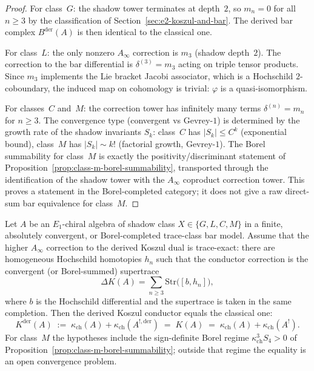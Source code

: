 \begin{proof}
For class~$G$: the shadow tower terminates at depth~$2$, so $m_n = 0$
for all $n \geq 3$ by the classification of
Section~\ref{sec:e2-koszul-and-bar}. The derived bar complex
$B^{\mathrm{der}}(A)$ is then identical to the classical one.

For class~$L$: the only nonzero $A_\infty$ correction is $m_3$
(shadow depth~$2$). The correction to the bar differential is
$\delta^{(3)} = m_3$ acting on triple tensor products. Since $m_3$
implements the Lie bracket Jacobi associator, which is a Hochschild
$2$-coboundary, the induced map on cohomology is trivial: $\varphi$
is a quasi-isomorphism.

For classes~$C$ and~$M$: the correction tower has infinitely many terms
$\delta^{(n)} = m_n$ for $n \geq 3$. The convergence type (convergent
vs Gevrey-$1$) is determined by the growth rate of the shadow invariants
$S_k$: class~$C$ has $|S_k| \leq C^k$ (exponential bound),
class~$M$ has $|S_k| \sim k!$ (factorial growth, Gevrey-$1$).
The Borel summability for class~$M$ is exactly the
positivity/discriminant statement of
Proposition~\ref{prop:class-m-borel-summability}, transported through
the identification of the shadow tower with the $A_\infty$ coproduct
correction tower. This proves a statement in the Borel-completed
category; it does not give a raw direct-sum bar equivalence for class~$M$.
\end{proof}

\begin{theorem}
\label{thm:derived-conductor}
Let $A$ be an $E_1$-chiral algebra of shadow class
$X \in \{G, L, C, M\}$ in a finite, absolutely convergent, or
Borel-completed trace-class bar model. Assume that the higher
$A_\infty$ correction to the derived Koszul dual is trace-exact:
there are homogeneous Hochschild homotopies $h_n$ such that the
conductor correction is the convergent \textup{(}or Borel-summed\textup{)}
supertrace
\[
 \Delta K(A)
 =
 \sum_{n\geq 3}
 \mathrm{Str}\bigl([b,h_n]\bigr),
\]
where $b$ is the Hochschild differential and the supertrace is taken
in the same completion. Then the derived Koszul conductor equals the
classical one:
\[
 K^{\mathrm{der}}(A)
 \;:=\; \kappa_{\mathrm{ch}}(A) + \kappa_{\mathrm{ch}}(A^{!,\mathrm{der}})
 \;=\; K(A)
 \;=\; \kappa_{\mathrm{ch}}(A) + \kappa_{\mathrm{ch}}(A^!).
\]
For class~$M$ the hypotheses include the sign-definite Borel regime
$\kappa_{\mathrm{ch}}^3S_4>0$ of
Proposition~\ref{prop:class-m-borel-summability}; outside that regime
the equality is an open convergence problem.
\end{theorem}

